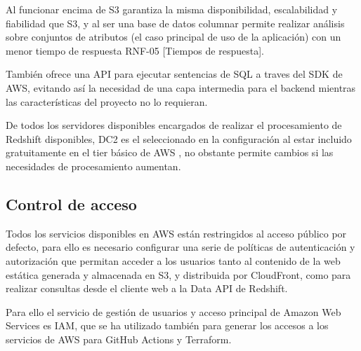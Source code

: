 Al funcionar encima de S3 garantiza la misma disponibilidad, escalabilidad y fiabilidad que S3, y al ser una base de datos columnar permite realizar análisis sobre conjuntos de atributos (el caso principal de uso de la aplicación) con un menor tiempo de respuesta RNF-05 [Tiempos de respuesta].

También ofrece una API para ejecutar sentencias de SQL a traves del SDK de AWS, evitando así la necesidad de una capa intermedia para el backend mientras las características del proyecto no lo requieran.

De todos los servidores disponibles encargados de realizar el procesamiento de Redshift disponibles, DC2 es el seleccionado en la configuración al estar incluido gratuitamente en el tier básico de AWS \cite{RedshiftPricing}, no obstante permite cambios si las necesidades de procesamiento aumentan.

\subsection{Control de acceso}

Todos los servicios disponibles en AWS están restringidos al acceso público por defecto, para ello es necesario configurar una serie de políticas de autenticación y autorización que permitan acceder a los usuarios tanto al contenido de la web estática generada y almacenada en S3, y distribuida por CloudFront, como para realizar consultas desde el cliente web a la Data API de Redshift.

Para ello el servicio de gestión de usuarios y acceso principal de Amazon Web Services es IAM, que se ha utilizado también para generar los accesos a los servicios de AWS para GitHub Actions y Terraform.

\newpage
